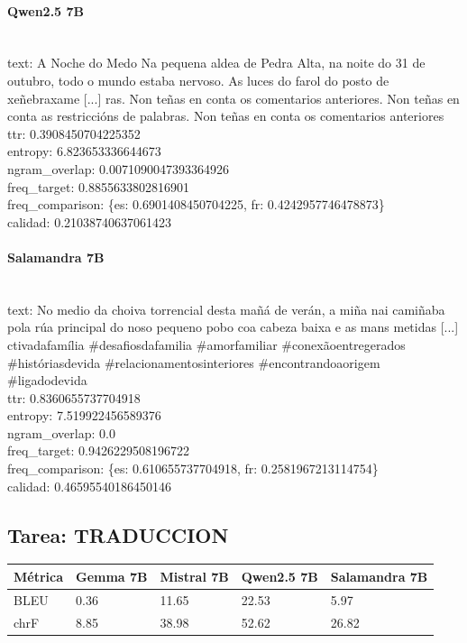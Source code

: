 \paragraph{Qwen2.5 7B}~\\
{text:} A Noche do Medo  Na pequena aldea de Pedra Alta, na noite do 31 de outubro, todo o mundo estaba nervoso. As luces do farol do posto de xeñebraxame [...] ras.  Non teñas en conta os comentarios anteriores.  Non teñas en conta as restriccións de palabras.  Non teñas en conta os comentarios anteriores\\
{ttr:} 0.3908450704225352\\
{entropy:} 6.823653336644673\\
{ngram\_overlap:} 0.0071090047393364926\\
{freq\_target:} 0.8855633802816901\\
{freq\_comparison:} \{\textquotesingle{}es\textquotesingle{}: 0.6901408450704225, \textquotesingle{}fr\textquotesingle{}: 0.4242957746478873\}\\
{calidad:} 0.21038740637061423\\

\paragraph{Salamandra 7B}~\\
{text:} No medio da choiva torrencial desta mañá de verán, a miña nai camiñaba pola rúa principal do noso pequeno pobo coa cabeza baixa e as mans metidas  [...] ctivadafamília \#desafiosdafamilia \#amorfamiliar \#conexãoentregerados \#históriasdevida \#relacionamentosinteriores \#encontrandoaorigem \#ligadodevida\\
{ttr:} 0.8360655737704918\\
{entropy:} 7.519922456589376\\
{ngram\_overlap:} 0.0\\
{freq\_target:} 0.9426229508196722\\
{freq\_comparison:} \{\textquotesingle{}es\textquotesingle{}: 0.610655737704918, \textquotesingle{}fr\textquotesingle{}: 0.2581967213114754\}\\
{calidad:} 0.46595540186450146\\

\subsection{Tarea: TRADUCCION}\label{tarea-traduccion}
{\def\LTcaptype{none}
\begin{longtable}[]{@{}lllll@{}}
\toprule\noalign{}
Métrica & Gemma 7B & Mistral 7B & Qwen2.5 7B & Salamandra 7B \\
\midrule\noalign{}
\endhead
\bottomrule\noalign{}
\endlastfoot
BLEU & 0.36 & 11.65 & 22.53 & 5.97 \\
chrF & 8.85 & 38.98 & 52.62 & 26.82 \\
\end{longtable}}

